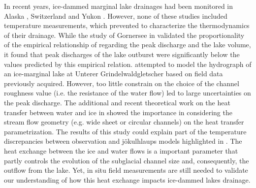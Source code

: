 In recent years, ice-dammed marginal lake drainages had been monitored in Alaska \citep[Hidden Creek Lake, ][]{Anderson&al2003,Anderson&al2005,Walder&al2005,Walder&al2006}, Switzerland \citep{Huss&al2007, Werder&al2010} and Yukon \citep{Bigelow&al2020}. However, none of these studies included temperature measurements, which prevented to characterize the thermodynamics of their drainage. 
While the study of Gornersee in \cite{Huss&al2007} validated the proportionality of the empirical relationship of \cite{Clague&Mathews1973} regarding the peak discharge and the lake volume, it found that peak discharges of the lake outburst were significantly below the values predicted by this empirical relation. \cite{Werder&al2010} attempted to model the hydrograph of an ice-marginal lake at Unterer Grindelwaldgletscher based on field data previously acquired. However, too little constrain on the choice of the channel roughness value (i.e. the resistance of the water flow) led to large uncertainties on the peak discharge. The additional and recent theoretical work on the heat transfer between water and ice in \cite{Sommers&Rajaram2020} showed the importance in considering the stream flow geometry (e.g. wide sheet or circular channels) on the heat transfer parametrization. The results of this study could explain part of the temperature discrepancies between observation and jökulhlaups models highlighted in \cite{Clarke2003,Flowers&al2004}. The heat exchange between the ice and water flows is a important parameter that partly controls the evolution of the subglacial channel size and, consequently, the outflow from the lake. Yet, in situ field measurements are still needed to validate our understanding of how this heat exchange impacts ice-dammed lakes drainage.


